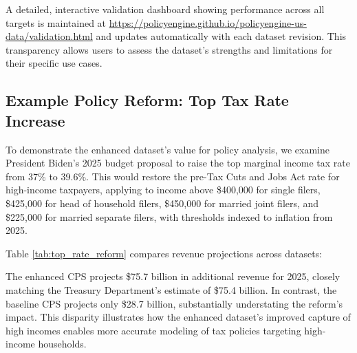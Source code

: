 A detailed, interactive validation dashboard showing performance across all targets is maintained at \url{https://policyengine.github.io/policyengine-us-data/validation.html} and updates automatically with each dataset revision. This transparency allows users to assess the dataset's strengths and limitations for their specific use cases.

\subsection{Example Policy Reform: Top Tax Rate Increase}

To demonstrate the enhanced dataset's value for policy analysis, we examine President Biden's 2025 budget proposal to raise the top marginal income tax rate from 37\% to 39.6\%. This would restore the pre-Tax Cuts and Jobs Act rate for high-income taxpayers, applying to income above \$400,000 for single filers, \$425,000 for head of household filers, \$450,000 for married joint filers, and \$225,000 for married separate filers, with thresholds indexed to inflation from 2025.

Table \ref{tab:top_rate_reform} compares revenue projections across datasets:



The enhanced CPS projects \$75.7 billion in additional revenue for 2025, closely matching the Treasury Department's estimate of \$75.4 billion. In contrast, the baseline CPS projects only \$28.7 billion, substantially understating the reform's impact. This disparity illustrates how the enhanced dataset's improved capture of high incomes enables more accurate modeling of tax policies targeting high-income households.